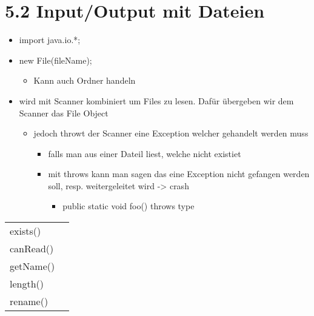 \documentclass[11pt]{article}
\begin{document}
\section{5.2 Input/Output mit Dateien}
\label{sec:orga5f7371}
\begin{itemize}
\item import java.io.*;\\

\item new File(fileName);\\
\begin{itemize}
\item Kann auch Ordner handeln\\
\end{itemize}

\item wird mit Scanner kombiniert um Files zu lesen. Dafür übergeben wir dem Scanner das File Object\\
\begin{itemize}
\item jedoch throwt der Scanner eine Exception welcher gehandelt werden muss\\
\begin{itemize}
\item falls man aus einer Dateil liest, welche nicht existiet\\
\item mit throws kann man sagen das eine Exception nicht gefangen werden soll, resp. weitergeleitet wird -> crash\\
\begin{itemize}
\item public static void foo() throws type\\
\end{itemize}
\end{itemize}
\end{itemize}
\end{itemize}


\begin{center}
\begin{tabular}{ll}
exists() & \\
canRead() & \\
getName() & \\
length() & \\
rename() & \\
\end{tabular}
\end{center}
\end{document}
